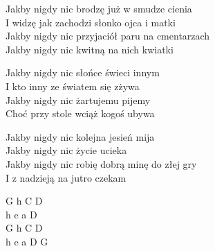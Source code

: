 \begin{text}
    Jakby nigdy nic brodzę już w smudze cienia\\
    I widzę jak zachodzi słonko ojca i matki\\
    Jakby nigdy nic przyjaciół paru na cmentarzach\\
    Jakby nigdy nic kwitną na nich kwiatki

    Jakby nigdy nic słońce świeci innym\\
    I kto inny ze światem się zżywa\\
    Jakby nigdy nic żartujemu pijemy\\
    Choć przy stole wciąż kogoś ubywa

    Jakby nigdy nic kolejna jesień mija\\
    Jakby nigdy nic życie ucieka\\
    Jakby nigdy nic robię dobrą minę do złej gry\\
    I z nadzieją na jutro czekam
\end{text}
\begin{chord}
    G h C D\\
    h e a D\\
    G h C D\\
    h e a D G
\end{chord}